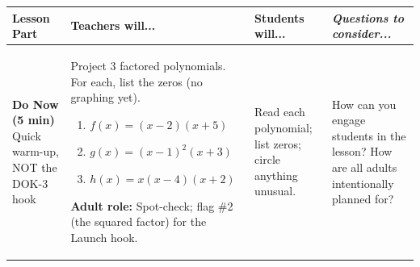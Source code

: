\documentclass[11pt]{article}
\begin{document}
\noindent
\begin{xltabular}{\textwidth}{|>{\raggedright\arraybackslash{}\hsize}X|
                               >{\raggedright\arraybackslash{}\hsize}X|
                               >{\raggedright\arraybackslash{}\hsize}X|
                               >{\raggedright\arraybackslash{}\hsize}X|}
\hline
\textbf{Lesson Part} & \textbf{Teachers will...} & \textbf{Students will...} & \textit{Questions to consider...} \\
\hline
\endhead

\textbf{Do Now (5 min)} \newline\newline Quick warm-up, NOT the DOK-3 hook &
Project 3 factored polynomials. For each, list the zeros (no graphing yet).
\scriptsize
\begin{enumerate}[label=\arabic*., leftmargin=*, nosep]
    \item $f(x) = (x-2)(x+5)$ \quad [zeros: $2, -5$]
    \item $g(x) = (x-1)^2(x+3)$ \quad [zeros: $1, -3$]
    \item $h(x) = x(x-4)(x+2)$ \quad [zeros: $0, 4, -2$]
\end{enumerate} \normalsize
\textbf{Adult role:} Spot-check; flag \#2 (the squared factor) for the Launch hook. &
Read each polynomial; list zeros; circle anything unusual. &
How can you engage students in the lesson? \newline\newline
How are all adults intentionally planned for? \\
\hline


\end{xltabular}
\end{document}
